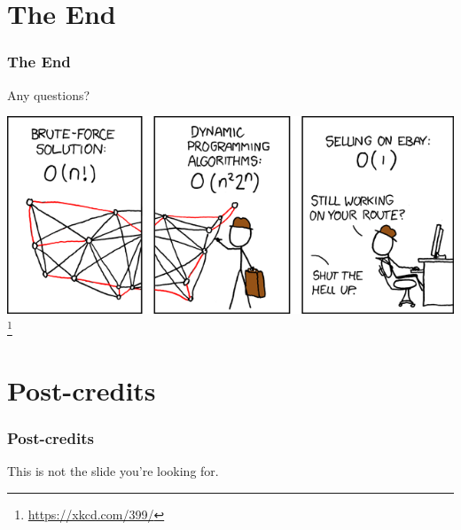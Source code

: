 \documentclass[]{beamer}
\begin{document}
\section{The End}

\begin{frame}
\frametitle{The End}
\begin{center}
Any questions?

\includegraphics[scale=0.5]{xkcd}\footnote{\url{https://xkcd.com/399/}}
\end{center}
\end{frame}

\section{Post-credits}

\begin{frame}
\frametitle{Post-credits}
\centerline{This is not the slide you're looking for.}
\end{frame}

\end{document}
